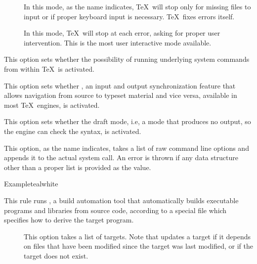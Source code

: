\begin{description}
\begin{description}
\begin{description}
\item[] In this mode, as the name indicates, \TeX\ will stop only for missing files to input or if proper keyboard input is necessary. \TeX\ fixes errors itself.

\item[] In this mode, \TeX\ will stop at each error, asking for proper user intervention. This is the most user interactive mode available.
\end{description}

\item[\rpsbox{shell}] This option sets whether the possibility of running underlying system commands from within \TeX\ is activated.

\item[\rpsbox{synctex}] This option sets whether , an input and output synchronization feature that allows navigation from source to typeset material and vice versa, available in most \TeX\ engines, is activated.

\item[\rpsbox{draft}] This option sets whether the draft mode, i.e, a mode that produces no output, so the engine can check the syntax, is activated.

\item[\abox{options}] This option, as the name indicates, takes a list of raw command line options and appends it to the actual system call. An error is thrown if any data structure other than a proper list is provided as the value.
\end{description}

\begin{codebox}{Example}{teal}{\icnote}{white}
\end{codebox}

\item[\rulebox{make}]
This rule runs , a build automation tool that automatically builds executable programs and libraries from source code, according to a special file which specifies how to derive the target program.

\begin{description}
\item[] This option takes a list of targets. Note that  updates a target if it depends on files that have been modified since the target was last modified, or if the target does not exist.


\end{description}
\end{description}
